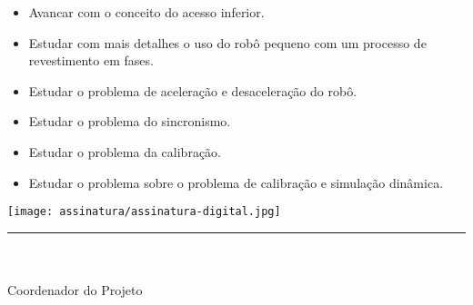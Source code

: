 \documentclass[12pt,a4paper]{article}
\begin{document}
\begin{itemize}
  \item Avancar com o conceito do acesso inferior.

  \item Estudar com mais detalhes o uso do robô pequeno com um processo de revestimento em fases.

  \item Estudar o problema de aceleração e desaceleração do robô.
  
  \item Estudar o problema do sincronismo.

  \item Estudar o problema da calibração.

  \item Estudar o problema sobre o problema de calibração e simulação dinâmica.

\end{itemize}




\vspace{20mm}%
\parbox[t]{70mm}{
  \centering
  \texttt{[image: assinatura/assinatura-digital.jpg]} \\[-4mm]
  \rule[2mm]{70mm}{0.1mm} \\
  \ramon \\[1mm]
  Coordenador do Projeto \\
}



\end{document}

